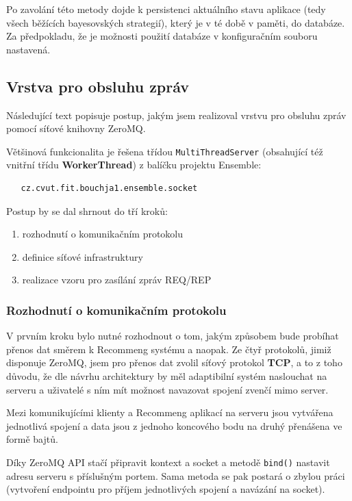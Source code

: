 \documentclass[thesis=M,czech]{FITthesis}[2014/05/07]
\begin{document}
Po zavolání této metody dojde k persistenci aktuálního stavu aplikace (tedy všech běžících bayesovských strategií), který je v té době v paměti, do databáze. Za předpokladu, že je možnosti použití databáze v konfiguračním souboru nastavená.

\subsection{Vrstva pro obsluhu zpráv}
\label{sub:messvrs}
Následující text popisuje postup, jakým jsem realizoval vrstvu pro obsluhu zpráv pomocí síťové knihovny ZeroMQ.

Většinová funkcionalita je řešena třídou \texttt{MultiThreadServer} (obsahující též vnitřní třídu \textbf{WorkerThread}) z balíčku projektu Ensemble:

\begin{verbatim}
   cz.cvut.fit.bouchja1.ensemble.socket
\end{verbatim}

Postup by se dal shrnout do tří kroků:

\begin{enumerate}
	\item rozhodnutí o komunikačním protokolu
	\item definice síťové infrastruktury
	\item realizace vzoru pro zasílání zpráv REQ/REP
\end{enumerate}

\subsubsection{Rozhodnutí o komunikačním protokolu}
\label{subsub:kompr}
V prvním kroku bylo nutné rozhodnout o tom, jakým způsobem bude probíhat přenos dat směrem k Recommeng systému a naopak. Ze čtyř protokolů, jimiž disponuje ZeroMQ, jsem pro přenos dat zvolil síťový protokol \textbf{TCP}, a to z toho důvodu, že dle návrhu architektury by měl adaptibilní systém naslouchat na serveru a uživatelé s ním mít možnost navazovat spojení zvenčí mimo server.

Mezi komunikujícími klienty a Recommeng aplikací na serveru jsou vytvářena jednotlivá spojení a data jsou z jednoho koncového bodu na druhý přenášena ve formě bajtů.

Díky ZeroMQ API stačí připravit kontext a socket a metodě \texttt{bind()} nastavit adresu serveru s příslušným portem. Sama metoda se pak postará o zbylou práci (vytvoření endpointu pro příjem jednotlivých spojení a navázání na socket).
\end{document}
